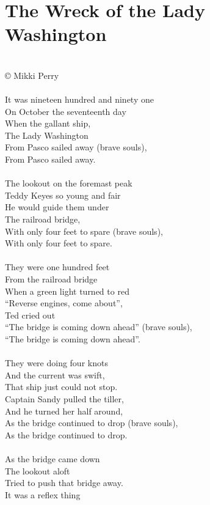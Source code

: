 \documentclass[letterpaper,14pt]{extarticle}
\begin{document}
\section{The Wreck of the Lady Washington}
\noindent
\\© Mikki Perry
\\
\\It was nineteen hundred and ninety one
\\On October the seventeenth day
\\When the gallant ship,
\\The Lady Washington
\\From Pasco sailed away (brave souls),
\\From Pasco sailed away.
\\
\\The lookout on the foremast peak
\\Teddy Keyes so young and fair
\\He would guide them under
\\The railroad bridge,
\\With only four feet to spare (brave souls),
\\With only four feet to spare.
\\
\\They were one hundred feet
\\From the railroad bridge
\\When a green light turned to red
\\“Reverse engines, come about”,
\\Ted cried out
\\“The bridge is coming down ahead” (brave souls),
\\“The bridge is coming down ahead”.
\\
\\They were doing four knots
\\And the current was swift,
\\That ship just could not stop.
\\Captain Sandy pulled the tiller,
\\And he turned her half around,
\\As the bridge continued to drop (brave souls),
\\As the bridge continued to drop.
\\
\\As the bridge came down
\\The lookout aloft
\\Tried to push that bridge away.
\\It was a reflex thing
\end{document}
